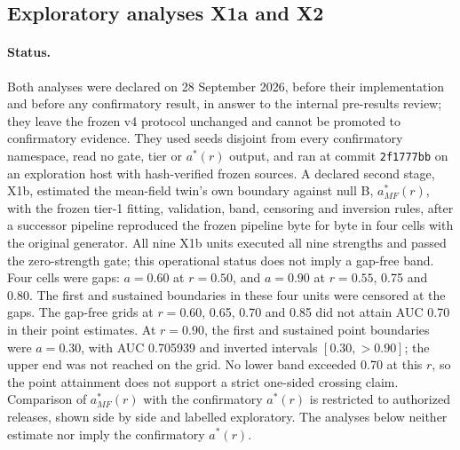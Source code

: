 
\subsection*{Exploratory analyses X1a and X2}\label{supp:x1-x2}

\paragraph{Status.}
Both analyses were declared on 28 September 2026, before their implementation and before any confirmatory result, in answer to the internal pre-results review; they leave the frozen v4 protocol unchanged and cannot be promoted to confirmatory evidence. %
They used seeds disjoint from every confirmatory namespace, read no gate, tier or $a^*(r)$ output, and ran at commit \texttt{2f1777bb} on an exploration host with hash-verified frozen sources. %
A declared second stage, X1b, estimated the mean-field twin's own boundary against null B, $a^*_{MF}(r)$, with the frozen tier-1 fitting, validation, band, censoring and inversion rules, after a successor pipeline reproduced the frozen pipeline byte for byte in four cells with the original generator. %
All nine X1b units executed all nine strengths and passed the zero-strength gate; this operational status does not imply a gap-free band. %
Four cells were gaps: $a=0.60$ at $r=0.50$, and $a=0.90$ at $r=0.55$, 0.75 and 0.80. %
The first and sustained boundaries in these four units were censored at the gaps. %
The gap-free grids at $r=0.60$, 0.65, 0.70 and 0.85 did not attain AUC 0.70 in their point estimates. %
At $r=0.90$, the first and sustained point boundaries were $a=0.30$, with AUC 0.705939 and inverted intervals $[0.30,>0.90]$; the upper end was not reached on the grid. %
No lower band exceeded 0.70 at this $r$, so the point attainment does not support a strict one-sided crossing claim. %
Comparison of $a^*_{MF}(r)$ with the confirmatory $a^*(r)$ is restricted to authorized releases, shown side by side and labelled exploratory. %
The analyses below neither estimate nor imply the confirmatory $a^*(r)$. %

